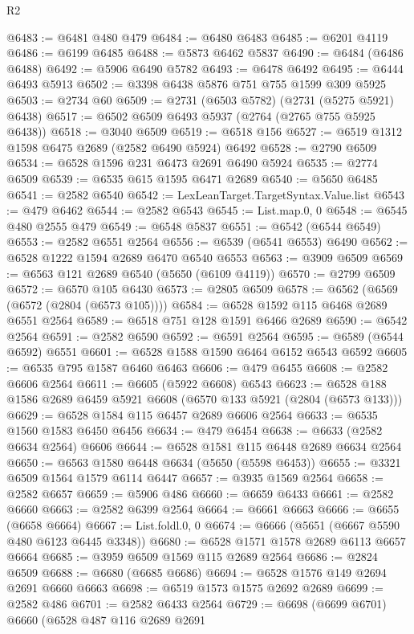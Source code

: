 \begin{lexlean}{R2}
\begin{coremodule}
@6483 := @6481 @480 @479
@6484 := @6480 @6483
@6485 := @6201 @4119
@6486 := @6199 @6485
@6488 := @5873 @6462 @5837
@6490 := @6484 (@6486 @6488)
@6492 := @5906 @6490 @5782
@6493 := @6478 @6492
@6495 := @6444 @6493 @5913
@6502 := @3398 @6438 @5876 @751 @755 @1599 @309 @5925
@6503 := @2734 @60
@6509 := @2731 (@6503 @5782) (@2731 (@5275 @5921) @6438)
@6517 := @6502 @6509 @6493 @5937 (@2764 (@2765 @755 @5925 @6438))
@6518 := @3040 @6509
@6519 := @6518 @156
@6527 := @6519 @1312 @1598 @6475 @2689 (@2582 @6490 @5924) @6492
@6528 := @2790 @6509
@6534 := @6528 @1596 @231 @6473 @2691 @6490 @5924
@6535 := @2774 @6509
@6539 := @6535 @615 @1595 @6471 @2689
@6540 := @5650 @6485
@6541 := @2582 @6540
@6542 := LexLeanTarget.TargetSyntax.Value.list
@6543 := @479 @6462
@6544 := @2582 @6543
@6545 := List.map.{0, 0}
@6548 := @6545 @480 @2555 @479
@6549 := @6548 @5837
@6551 := @6542 (@6544 @6549)
@6553 := @2582 @6551 @2564
@6556 := @6539 (@6541 @6553) @6490
@6562 := @6528 @1222 @1594 @2689 @6470 @6540 @6553
@6563 := @3909 @6509
@6569 := @6563 @121 @2689 @6540 (@5650 (@6109 @4119))
@6570 := @2799 @6509
@6572 := @6570 @105 @6430
@6573 := @2805 @6509
@6578 := @6562 (@6569 (@6572 (@2804 (@6573 @105))))
@6584 := @6528 @1592 @115 @6468 @2689 @6551 @2564
@6589 := @6518 @751 @128 @1591 @6466 @2689
@6590 := @6542 @2564
@6591 := @2582 @6590
@6592 := @6591 @2564
@6595 := @6589 (@6544 @6592) @6551
@6601 := @6528 @1588 @1590 @6464 @6152 @6543 @6592
@6605 := @6535 @795 @1587 @6460 @6463
@6606 := @479 @6455
@6608 := @2582 @6606 @2564
@6611 := @6605 (@5922 @6608) @6543
@6623 := @6528 @188 @1586 @2689 @6459 @5921 @6608 (@6570 @133 @5921 (@2804 (@6573 @133)))
@6629 := @6528 @1584 @115 @6457 @2689 @6606 @2564
@6633 := @6535 @1560 @1583 @6450 @6456
@6634 := @479 @6454
@6638 := @6633 (@2582 @6634 @2564) @6606
@6644 := @6528 @1581 @115 @6448 @2689 @6634 @2564
@6650 := @6563 @1580 @6448 @6634 (@5650 (@5598 @6453))
@6655 := @3321 @6509 @1564 @1579 @6114 @6447
@6657 := @3935 @1569 @2564
@6658 := @2582 @6657
@6659 := @5906 @486
@6660 := @6659 @6433
@6661 := @2582 @6660
@6663 := @2582 @6399 @2564
@6664 := @6661 @6663
@6666 := @6655 (@6658 @6664)
@6667 := List.foldl.{0, 0}
@6674 := @6666 (@5651 (@6667 @5590 @480 @6123 @6445 @3348))
@6680 := @6528 @1571 @1578 @2689 @6113 @6657 @6664
@6685 := @3959 @6509 @1569 @115 @2689 @2564
@6686 := @2824 @6509
@6688 := @6680 (@6685 @6686)
@6694 := @6528 @1576 @149 @2694 @2691 @6660 @6663
@6698 := @6519 @1573 @1575 @2692 @2689
@6699 := @2582 @486
@6701 := @2582 @6433 @2564
@6729 := @6698
    (@6699 @6701)
    @6660
    (@6528
      @487
      @116
      @2689
      @2691

\end{coremodule}
\end{lexlean}
